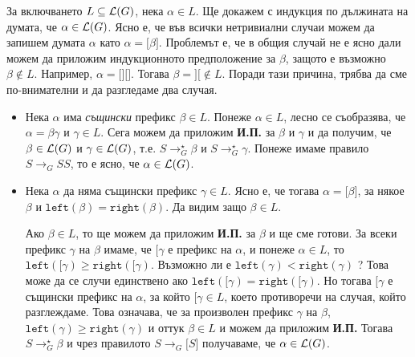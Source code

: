 \begin{hint}
  За включването $L \subseteq \mathcal{L}(G)$, нека $\alpha \in L$.
  Ще докажем с индукция по дължината на думата, че $\alpha \in \mathcal{L}(G)$.
  Ясно е, че във всички нетривиални случаи можем да запишем думата $\alpha$ като $\alpha = \texttt{[}\beta\texttt{]}$.
  Проблемът е, че в общия случай не е ясно дали можем да приложим индукционното предположение за $\beta$,
  защото е възможно $\beta \not\in L$. Например, $\alpha = \texttt{[][]}$.
  Тогава $\beta = \texttt{][} \not \in L$.
  Поради тази причина, трябва да сме по-внимателни и да разгледаме два случая.
  \begin{itemize}
  \item 
    Нека $\alpha$ има {\em същински} префикс $\beta \in L$.
    Понеже $\alpha \in L$, лесно се съобразява, че $\alpha = \beta\gamma$ и $\gamma \in L$.
    Сега можем да приложим {\bf И.П.} за $\beta$ и $\gamma$ и да получим, че 
    $\beta \in \mathcal{L}(G)$ и $\gamma \in \mathcal{L}(G)$, т.е.
    $S \to^\star_G \beta$ и $S \to^\star_G \gamma$.
    Понеже имаме правило $S \to_G SS$, то е ясно, че $\alpha \in \mathcal{L}(G)$.
  \item
    Нека $\alpha$ да няма същински префикс $\gamma \in L$.
    Ясно е, че тогава $\alpha = \texttt{[}\beta\texttt{]}$, за някое $\beta$
    и $\texttt{left}(\beta) = \texttt{right}(\beta)$.
    Да видим защо $\beta \in L$.
    
    Ако $\beta \in L$, то ще можем да приложим {\bf И.П.} за $\beta$ и ще сме готови.
    За всеки префикс $\gamma$ на $\beta$ имаме, че $\texttt{[}\gamma$ е префикс на $\alpha$,
    и понеже $\alpha \in L$, то $\texttt{left}(\texttt{[}\gamma) \geq \texttt{right}(\texttt{[}\gamma)$.
    Възможно ли е $\texttt{left}(\gamma) < \texttt{right}(\gamma)$ ?
    Това може да се случи единствено ако $\texttt{left}(\texttt{[}\gamma) = \texttt{right}(\texttt{[}\gamma)$.
    Но тогава $\texttt{[}\gamma$ е същински префикс на $\alpha$, за който $\texttt{[}\gamma \in L$,
    което противоречи на случая, който разглеждаме.
    Това означава, че за произволен префикс $\gamma$ на $\beta$,
    $\texttt{left}(\gamma) \geq \texttt{right}(\gamma)$ и оттук $\beta \in L$ и можем да приложим {\bf И.П.}
    Тогава $S \to^\star_G \beta$ и чрез правилото $S \to_G \texttt{[}S\texttt{]}$
    получаваме, че $\alpha \in \mathcal{L}(G)$.    
  \end{itemize}
\end{hint}

